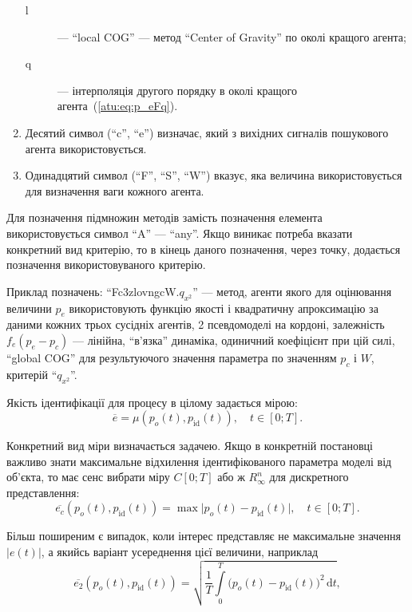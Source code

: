 \documentclass[a4paper,13pt]{atuaref}
\begin{document}
\begin{enumerate}
\begin{description}
      \item[l] --- ``local COG'' ---
        метод ``Center of Gravity'' по околі кращого агента;

      \item[q] ---
        інтерполяція другого порядку в околі кращого агента~(\ref{atu:eq:p_eFq}).

    \end{description}

  \item
    Десятий символ (``c'', ``e'') визначає, який з вихідних сигналів пошукового агента використовується.

  \item
    Одинадцятий символ (``F'', ``S'', ``W'') вказує, яка величина використовується для визначення ваги кожного агента.


\end{enumerate}
%
Для позначення підмножин методів замість позначення елемента використовується символ ``A'' --- ``any''.
Якщо виникає потреба вказати конкретний вид критерію, то в кінець даного
позначення, через точку, додається позначення використовуваного критерію.

Приклад позначень:
``Fc3zlovngcW.$q_{x^2}$''
--- метод, агенти якого для оцінювання величини $ p_e $ використовують функцію
якості і квадратичну апроксимацію за даними кожних трьох сусідніх агентів, 2
псевдомоделі на кордоні, залежність $ f_e (p_e-p_c) $ --- лінійна, ``в'язка''
динаміка, одиничний коефіцієнт при цій силі, ``global COG'' для результуючого
значення параметра по значенням $p_c$ і $W$, критерій
``$q_{x^2}$''.


Якість ідентифікації для процесу в цілому задається мірою:
%
\[
  \overline{e} = \mu( p_o(t), p_\mathrm{id}(t) ),
  \quad
  t \in [0;T].
\]

Конкретний вид міри визначається задачею. Якщо в конкретній постановці
важливо знати максимальне відхилення ідентифікованого параметра моделі від
об'єкта, то має сенс вибрати міру $ C[0; T] $ або ж $ R_{\infty}^n$ для
дискретного представлення:
%
\begin{equation}
  \overline{e_c}(p_o(t),p_\mathrm{id}(t))
  =
  \max \big| p_o(t)-p_\mathrm{id}(t) \big|,
  \quad
  t \in [0;T].
  \label{atu:eq:e_c}
\end{equation}

Більш поширеним є випадок, коли інтерес представляє не максимальне значення
$ |e(t)| $, а якийсь варіант усереднення цієї величини, наприклад
%
\begin{equation}
  \overline{e_2}(p_o(t),p_\mathrm{id}(t))
  =
  \sqrt{ \frac{1}{T} \int\limits_{0}^{T} \big( p_o(t)-p_\mathrm{id}(t) \big)^2 \, \mathrm{d}t },
  \label{atu:eq:e_2}
\end{equation}
\end{document}
